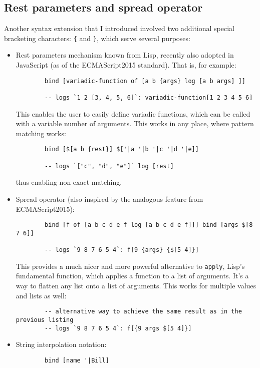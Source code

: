 \subsection{Rest parameters and spread operator}\label{sub:rest}
Another syntax extension that I introduced involved two additional special
bracketing characters: \texttt{\{} and \texttt{\}}, which serve several
purposes:
\begin{itemize}
    \item Rest parameters mechanism known from
      Lisp\cite[Section~12.2.3]{emacs_lisp_reference},
      recently also adopted in JavaScript (as of the ECMAScript2015
      standard\cite{mdn_rest}). That
      is, for example:
    \begin{lstlisting}
        bind [variadic-function of [a b {args} log [a b args] ]]
        
        -- logs `1 2 [3, 4, 5, 6]`: variadic-function[1 2 3 4 5 6]
    \end{lstlisting}
    This enables the user to easily define variadic functions, which can be
    called with a variable number of arguments.  This works in any place, where
    pattern matching works:
    \begin{lstlisting}
        bind [$[a b {rest}] $['|a '|b '|c '|d '|e]]
        
        -- logs `["c", "d", "e"]` log [rest]
    \end{lstlisting}
    
    thus enabling non-exact matching.
    
    \item Spread operator (also inspired by the analogous feature from
      ECMAScript2015):
    \begin{lstlisting}
        bind [f of [a b c d e f log [a b c d e f]]] bind [args $[8 7 6]]
        
        -- logs `9 8 7 6 5 4`: f[9 {args} {$[5 4]}]
    \end{lstlisting}
    This provides a much nicer and more powerful alternative to \texttt{apply},
    Lisp's fundamental function, which applies a function to a list of
    arguments. It's a way to flatten any list onto a list of arguments. This
    works for multiple values and lists as well:
    \begin{lstlisting}
        -- alternative way to achieve the same result as in the previous listing
        -- logs `9 8 7 6 5 4`: f[{9 args $[5 4]}]
    \end{lstlisting}
    \item String interpolation notation:
    \begin{lstlisting}
        bind [name '|Bill]
        

\end{lstlisting}
\end{itemize}

